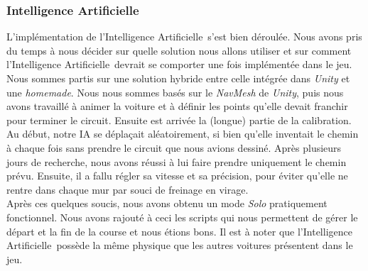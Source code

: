 \documentclass[a4paper,12pt]{article}
\newcommand{\AI}{Intelligence Artificielle}
\begin{document}
            \subsubsection{\AI}
                L'implémentation de l'\AI\, s'est bien déroulée. Nous avons pris du temps
                à nous décider sur quelle solution nous allons utiliser et sur comment
                l'\AI\, devrait se comporter une fois implémentée dans le jeu. Nous sommes partis sur une
                solution hybride entre celle intégrée dans \textsl{Unity} et une \textit{homemade}.
                Nous nous sommes basés sur le \textit{NavMesh} de \textsl{Unity}, puis nous avons
                travaillé à animer la voiture et à définir les points qu'elle devait franchir pour
                terminer le circuit. Ensuite est arrivée
                la (longue) partie de la calibration. Au début, notre IA se déplaçait aléatoirement,
                si bien qu'elle inventait le chemin à chaque fois sans prendre le circuit que nous
                avions dessiné. Après plusieurs jours de recherche, nous avons réussi à lui faire
                prendre uniquement le chemin prévu. Ensuite, il a fallu régler sa vitesse et sa
                précision, pour éviter qu'elle ne rentre dans chaque mur par souci de freinage en virage.\\
                Après ces quelques soucis, nous avons obtenu un mode \textsl{Solo} pratiquement
                fonctionnel. Nous avons rajouté à ceci les scripts qui nous permettent de gérer
                le départ et la fin de la course et nous étions bons. Il est à noter que l'\AI\ possède la même 
                physique que les autres voitures présentent dans le jeu.
\end{document}
